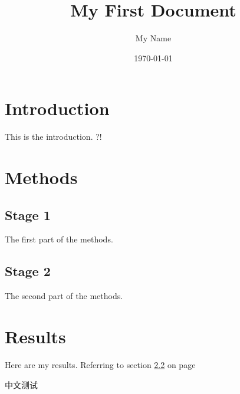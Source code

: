 \documentclass[a4paper, 10pt]{paper}
\begin{document}
    \title{My First Document}
    \author{My Name}
    \date{\today}
    \maketitle

    \tableofcontents
    \newpage

    \section{Introduction}
    This is the introduction. ?!

    \section{Methods}

        \subsection{Stage 1}
        \label{sec1} The first part of the methods.

        \subsection{Stage 2}
        \label{sec2} The second part of the methods.

    \section{Results}
    Here are my results. Referring to section \ref{sec2} on page \pageref{sec1}

中文测试

\inputminted[frame=single, linenos=true]{cpp}{../ST.cpp}
\inputminted[frame=single, linenos=true]{cpp}{../dijkstra.cpp}
\end{document}
